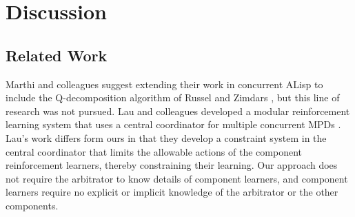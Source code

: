 \section{Discussion}



\subsection{Related Work}

Marthi and colleagues \cite{marthi2005concurrent} suggest extending their work in concurrent ALisp to include the Q-decomposition algorithm of Russel and Zimdars \cite{russell2003q-decomposition}, but this line of research was not pursued. Lau and colleagues developed a modular reinforcement learning system that uses a central coordinator for multiple concurrent MPDs \cite{lau2012coordination}. Lau's work differs form ours in that they develop a constraint system in the central coordinator that limits the allowable actions of the component reinforcement learners, thereby constraining their learning. Our approach does not require the arbitrator to know details of component learners, and component learners require no explicit or implicit knowledge of the arbitrator or the other components.

